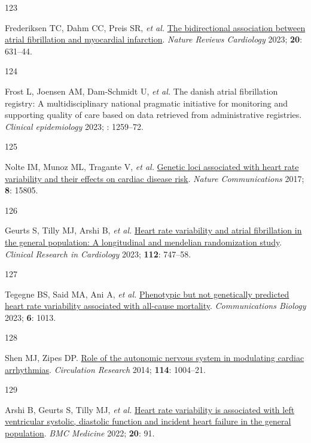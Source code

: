 \documentclass[
  a4paper,
  headsepline=true,
  open=left]{scrbook}
\newlength{\cslhangindent}
\newlength{\csllabelwidth}
\newlength{\cslentryspacingunit} %
\newenvironment{CSLReferences}[2] %
 {%
  \setlength{\parindent}{0pt}
  \ifodd #1
  \let\oldpar\par
  \def\par{\hangindent=\cslhangindent\oldpar}
  \fi
  \setlength{\parskip}{#2\cslentryspacingunit}
 }%
 {}
\newcommand{\CSLLeftMargin}[1]{\parbox[t]{\csllabelwidth}{#1}}
\newcommand{\CSLRightInline}[1]{\parbox[t]{\linewidth - \csllabelwidth}{#1}\break}
\begin{document}
\begin{CSLReferences}{0}{0}
\leavevmode{}%
\CSLLeftMargin{123 }%
\CSLRightInline{Frederiksen TC, Dahm CC, Preis SR, \emph{et al.}
\href{https://doi.org/10.1038/s41569-023-00857-3}{The bidirectional
association between atrial fibrillation and myocardial infarction}.
\emph{Nature Reviews Cardiology} 2023; \textbf{20}: 631--44.}

\leavevmode{}%
\CSLLeftMargin{124 }%
\CSLRightInline{Frost L, Joensen AM, Dam-Schmidt U, \emph{et al.} The
danish atrial fibrillation registry: A multidisciplinary national
pragmatic initiative for monitoring and supporting quality of care based
on data retrieved from administrative registries. \emph{Clinical
epidemiology} 2023; : 1259--72.}

\leavevmode{}%
\CSLLeftMargin{125 }%
\CSLRightInline{Nolte IM, Munoz ML, Tragante V, \emph{et al.}
\href{https://doi.org/10.1038/ncomms15805}{Genetic loci associated with
heart rate variability and their effects on cardiac disease risk}.
\emph{Nature Communications} 2017; \textbf{8}: 15805.}

\leavevmode{}%
\CSLLeftMargin{126 }%
\CSLRightInline{Geurts S, Tilly MJ, Arshi B, \emph{et al.}
\href{https://doi.org/10.1007/s00392-022-02072-5}{Heart rate variability
and atrial fibrillation in the general population: A longitudinal and
mendelian randomization study}. \emph{Clinical Research in Cardiology}
2023; \textbf{112}: 747--58.}

\leavevmode{}%
\CSLLeftMargin{127 }%
\CSLRightInline{Tegegne BS, Said MA, Ani A, \emph{et al.}
\href{https://doi.org/10.1038/s42003-023-05376-y}{Phenotypic but not
genetically predicted heart rate variability associated with all-cause
mortality}. \emph{Communications Biology} 2023; \textbf{6}: 1013.}

\leavevmode{}%
\CSLLeftMargin{128 }%
\CSLRightInline{Shen MJ, Zipes DP.
\href{https://doi.org/10.1161/CIRCRESAHA.113.302549}{Role of the
autonomic nervous system in modulating cardiac arrhythmias}.
\emph{Circulation Research} 2014; \textbf{114}: 1004--21.}

\leavevmode{}%
\CSLLeftMargin{129 }%
\CSLRightInline{Arshi B, Geurts S, Tilly MJ, \emph{et al.}
\href{https://doi.org/10.1186/s12916-022-02273-9}{Heart rate variability
is associated with left ventricular systolic, diastolic function and
incident heart failure in the general population}. \emph{BMC Medicine}
2022; \textbf{20}: 91.}


\end{CSLReferences}
\end{document}
